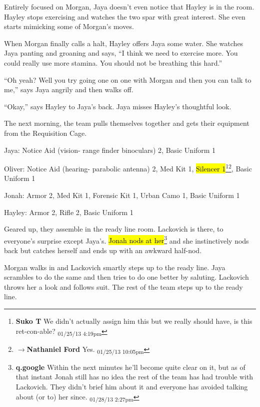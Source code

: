 Entirely focused on Morgan, Jaya doesn't even notice that Hayley is in the room.  Hayley stops exercising and watches the two spar with great interest.  She even starts mimicking some of Morgan's moves. 



When Morgan finally calls a halt, Hayley offers Jaya some water.  She watches Jaya panting and groaning and says, ``I think we need to exercise more.  You could really use more stamina.  You should not be breathing this hard.''

``Oh yeah?  Well you try going one on one with Morgan and then you can talk to me,'' says Jaya angrily and then walks off.

``Okay,'' says Hayley to Jaya's back.  Jaya misses Hayley's thoughtful look.



The next morning, the team pulls themselves together and gets their equipment from the Requisition Cage.



Jaya: Notice Aid (vision- range finder binoculars) 2, Basic Uniform 1

Oliver: Notice Aid (hearing- parabolic antenna) 2, Med Kit 1, \hl{Silencer 1}\footnote{\textbf{Suko T }We didn't actually assign him this but we really should have, is this ret-con-able? \textsubscript{01/25/13 4:19pm}}\footnote{$\rightarrow$\textbf{Nathaniel Ford }Yes. \textsubscript{01/25/13 10:05pm}}, Basic Uniform 1

Jonah:  Armor 2, Med Kit 1, Forensic Kit 1, Urban Camo 1, Basic Uniform 1

Hayley: Armor 2, Rifle 2, Basic Uniform 1



Geared up, they assemble in the ready line room.  Lackovich is there, to everyone's surprise except Jaya's. \hl{Jonah nods at her}\footnote{\textbf{q.google }Within the next minutes he'll become quite clear on it, but as of that instant Jonah still has no idea the rest of the team has had trouble with Lackovich.  They didn't brief him about it and everyone has avoided talking about (or to) her since. \textsubscript{01/28/13 2:27pm}} and she instinctively nods back but catches herself and ends up with an awkward half-nod.



Morgan walks in and Lackovich smartly steps up to the ready line.  Jaya scrambles to do the same and then tries to do one better by saluting.  Lackovich throws her a look and follows suit.  The rest of the team steps up to the ready line.



